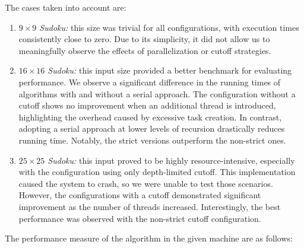 \documentclass[paper=a4, fontsize=12pt]{scrartcl}
\numberwithin{equation}{section}
\numberwithin{figure}{section}
\numberwithin{table}{section}
\begin{document}
    The cases taken into account are:
    \begin{enumerate}
        \item \textit{$9\times 9$ Sudoku:} this size was trivial for all configurations, with execution times consistently close to zero. 
            Due to its simplicity, it did not allow us to meaningfully observe the effects of parallelization or cutoff strategies.
        \item \textit{$16\times 16$ Sudoku:} this input size provided a better benchmark for evaluating performance.
            We observe a significant difference in the running times of algorithms with and without a serial approach. 
            The configuration without a cutoff shows no improvement when an additional thread is introduced, highlighting the overhead caused by excessive task creation. 
            In contrast, adopting a serial approach at lower levels of recursion drastically reduces running time. 
            Notably, the strict versions outperform the non-strict ones.
        \item \textit{$25\times 25$ Sudoku:} this input proved to be highly resource-intensive, especially with the configuration using only depth-limited cutoff. 
            This implementation caused the system to crash, so we were unable to test those scenarios. 
            However, the configurations with a cutoff demonstrated significant improvement as the number of threads increased.
            Interestingly, the best performance was observed with the non-strict cutoff configuration.
    \end{enumerate}
    The performance measure of the algorithm in the given machine are as follows: 
\end{document}
